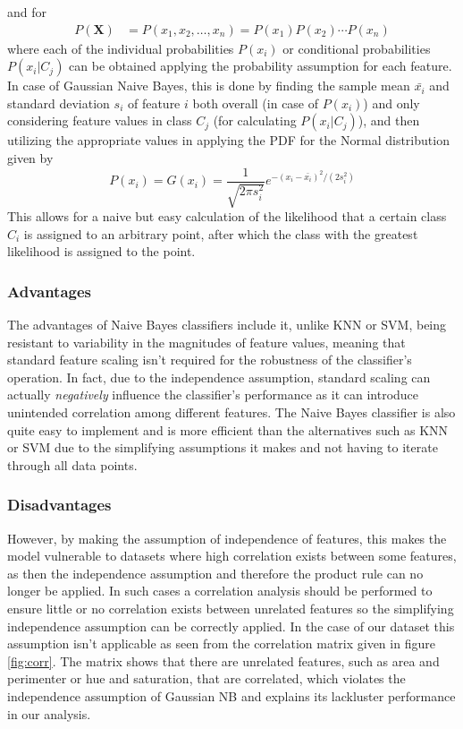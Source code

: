 \documentclass[journal,twocolumn,12pt,twoside]{IEEEtran}
\begin{document}
and for
\begin{align*}
    P(\mathbf{X})&=P(x_1,x_2,\ldots,x_n)=P(x_1)P(x_2)\cdots P(x_n)
\end{align*}
where each of the individual probabilities $P(x_i)$ or conditional probabilities $P(x_i|C_j)$ can be obtained applying the probability assumption for each feature. In case of Gaussian Naive Bayes, this is done by finding the sample mean $\bar{x_i}$ and standard deviation $s_i$ of feature $i$ both overall (in case of $P(x_i)$) and only considering feature values in class $C_j$ (for calculating $P(x_i|C_j)$), and then utilizing the appropriate values in applying the PDF for the Normal distribution given by 
$$P(x_i)=G(x_i)=\frac{1}{\sqrt{2\pi s_i^2}}e^{-(x_i-\bar{x_i})^2/(2s_i^2)}$$
This allows for a naive but easy calculation of the likelihood that a certain class $C_i$ is assigned to an arbitrary point, after which the class with the greatest likelihood is assigned to the point.
\subsubsection{Advantages}
The advantages of Naive Bayes classifiers include it, unlike KNN or SVM, being resistant to variability in the magnitudes of feature values, meaning that standard feature scaling isn't required for the robustness of the classifier's operation. In fact, due to the independence assumption, standard scaling can actually \textit{negatively} influence the classifier's performance as it can introduce unintended correlation among different features. The Naive Bayes classifier is also quite easy to implement and is more efficient than the alternatives such as KNN or SVM due to the simplifying assumptions it makes and not having to iterate through all data points.
\subsubsection{Disadvantages}
However, by making the assumption of independence of features, this makes the model vulnerable to datasets where high correlation exists between some features, as then the independence assumption and therefore the product rule can no longer be applied. In such cases a correlation analysis should be performed to ensure little or no correlation exists between unrelated features so the simplifying independence assumption can be correctly applied. In the case of our dataset this assumption isn't applicable as seen from the correlation matrix given in figure \ref{fig:corr}. The matrix shows that there are unrelated features, such as area and perimenter or hue and saturation, that are correlated, which violates the independence assumption of Gaussian NB and explains its lackluster performance in our analysis.
\end{document}
